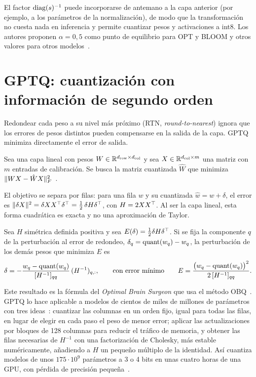 El factor $\operatorname{diag}(s)^{-1}$ puede incorporarse de antemano a la capa anterior (por ejemplo, a los parámetros de la normalización), de modo que la transformación no cuesta nada en inferencia y permite cuantizar pesos y activaciones a int8. Los autores proponen $\alpha=0{,}5$ como punto de equilibrio para OPT y BLOOM y otros valores para otros modelos~\cite[§4]{smoothquant}.

\section{GPTQ: cuantización con información de segundo orden}

Redondear cada peso a su nivel más próximo (RTN, \emph{round-to-nearest}) ignora que los errores de pesos distintos pueden compensarse en la salida de la capa. GPTQ minimiza directamente el error de salida.

\begin{definicion}\label{def:capas}
Sea una capa lineal con pesos $W\in\mathbb{R}^{d_{\mathrm{row}}\times d_{\mathrm{col}}}$ y sea $X\in\mathbb{R}^{d_{\mathrm{col}}\times m}$ una matriz con $m$ entradas de calibración. Se busca la matriz cuantizada $\hat W$ que minimiza $\lVert WX-\hat WX\rVert_F^{2}$~\cite[§3, ec.~1]{gptq}.
\end{definicion}

El objetivo se separa por filas: para una fila $w$ y su cuantizada $\hat w=w+\delta$, el error es $\lVert\delta X\rVert^{2}=\delta XX^{\top}\delta^{\top}=\tfrac12\,\delta H\delta^{\top}$, con $H=2XX^{\top}$. Al ser la capa lineal, esta forma cuadrática es exacta y no una aproximación de Taylor.

\begin{teorema}\label{teo:obs}
Sea $H$ simétrica definida positiva y sea $E(\delta)=\tfrac12\delta H\delta^{\top}$. Si se fija la componente $q$ de la perturbación al error de redondeo, $\delta_q=\operatorname{quant}(w_q)-w_q$, la perturbación de los demás pesos que minimiza $E$ es
\[
\delta=-\frac{w_q-\operatorname{quant}(w_q)}{[H^{-1}]_{qq}}\,(H^{-1})_{q,:},
\qquad\text{con error mínimo}\qquad E=\frac{\bigl(w_q-\operatorname{quant}(w_q)\bigr)^{2}}{2\,[H^{-1}]_{qq}}.
\]
\end{teorema}

Este resultado es la fórmula del \emph{Optimal Brain Surgeon} que usa el método OBQ~\cite[§3, ec.~2]{gptq}. GPTQ lo hace aplicable a modelos de cientos de miles de millones de parámetros con tres ideas~\cite[§4]{gptq}: cuantizar las columnas en un orden fijo, igual para todas las filas, en lugar de elegir en cada paso el peso de menor error; aplicar las actualizaciones por bloques de 128 columnas para reducir el tráfico de memoria, y obtener las filas necesarias de $H^{-1}$ con una factorización de Cholesky, más estable numéricamente, añadiendo a $H$ un pequeño múltiplo de la identidad. Así cuantiza modelos de unos $175\cdot 10^{9}$ parámetros a 3 o 4 bits en unas cuatro horas de una GPU, con pérdida de precisión pequeña~\cite{gptq}.

